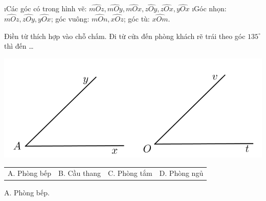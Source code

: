 \begin{bt}%
	\begin{loigiaichuong30}
		\begin{enumerate}[a),leftmargin=*]
			\i Các góc có trong hình vẽ: $\widehat{mOz},\widehat{mOy},\widehat{mOx},\widehat{zOy},\widehat{zOx},\widehat{yOx}$
			\i Góc nhọn: $\widehat{mOz},\widehat{zOy},\widehat{yOx}$; góc vuông: $\widehat{mOn},\widehat{xOz}$; góc tù: $\widehat{xOm}$.
		\end{enumerate}
	\end{loigiaichuong30}
\end{bt}
\begin{bt}
	Điền từ thích hợp vào chỗ chấm. Đi từ cửa đến phòng khách rẽ trái theo góc ${{135}^\circ}$ thì đến \ldots 
	\begin{center}
		\includegraphics[width= 0.5\linewidth]{vd-30-15}
	\end{center}
	\begin{tabularx}{\textwidth}{*{4}{Y}}
	A. Phòng bếp&	B. Cầu thang&	C. Phòng tắm	&D. Phòng ngủ
	\end{tabularx}
	\begin{loigiaichuong30}
		A. Phòng bếp.
	\end{loigiaichuong30}
\end{bt}
